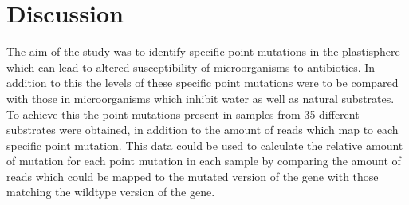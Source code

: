 \chapter{Discussion}






The aim of the study was to identify specific point mutations in the plastisphere which can lead to altered susceptibility of microorganisms to antibiotics. 
In addition to this the levels of these specific point mutations were to be compared with those in microorganisms which inhibit water as well as natural substrates.
To achieve this the point mutations present in samples from 35 different substrates
were obtained, in addition to the amount of reads which map to each specific point mutation. This data could be used to calculate the relative amount of mutation for each point mutation in each sample by comparing the amount of reads which could be mapped to the mutated version of the gene with those matching the wildtype version of the gene. 

